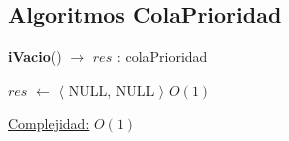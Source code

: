 \begin{Algoritmos}
\subsection{Algoritmos ColaPrioridad}


\begin{algorithm}[H]
{\textbf{iVacio}() $\to$ $res$ : colaPrioridad}
\begin{algorithmic}[1]
    \State $res$ $\gets$  $\langle$ NULL, NULL $\rangle$   \Comment $O(1)$

	\medskip
	\Statex \underline{Complejidad:} $O(1)$
\end{algorithmic}
\end{algorithm}
   
   
   
\end{Algoritmos}